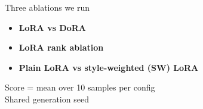 \documentclass[aspectratio=169]{beamer}
\begin{document}
\begin{frame}{Three ablations we run}
  \vfill
  \large
  \begin{itemize}\setlength{\itemsep}{16pt}
    \item \textbf{LoRA vs DoRA}
    \item \textbf{LoRA rank ablation}
    \item \textbf{Plain LoRA vs style-weighted (SW) LoRA}
  \end{itemize}
  \vfill
  {\centering\footnotesize\color{junk} Score = mean over 10 samples per config\\ Shared generation seed\par}
\end{frame}
\end{document}
